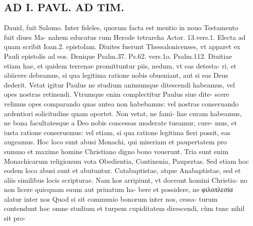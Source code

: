\documentclass{article}
\begin{document}
\begin{pages}
\section*{AD I. PAVL. AD TIM. }
\marginpar{[ p.440 ]}\pstart Dauid, fuit Salomo. Inter fideles, quorum facta est mentio in nouo Testamento fuit diues Ma- nahem educatus cum Herode tetrarcha Actor. 13.vers.1. Electa ad quam scribit Ioan.2. epistolam. Diuites fuerunt Thessalonicenses, vt apparet ex Pauli epistolis ad eos. Denique Psalm.37. Ps.62. vers.1o. Psalm.112. Diuitiae etiam hae, et quidem terrenae promittuntur piis, nedum, vt eas detesta- ri, et abiicere debeamus, si qua legitima ratione nobis obueniant, aut si eas Deus dederit.  \pend\pstart Vetat igitur Paulus ne studium animumque ditescendi habeamus, vel opes nostras retinendi. Vtrumque enim complectitur Paulus siue dite- scere velimus opes comparando quas antea non habebamus: vel nostras conseruando ardentiori solicitudine quam oportet. Non vetat, ne fami- liae curam habeamus, ne bona facultatesque a Deo nobis concessas moderate tueamur, cure- mus, et iusta ratione conseruemus: vel etiam, si qua ratione legitima fieri possit, eas augeamus. Hoc loco sunt abusi Monachi, qui miseriam et paupertatem pro summo et maxime homine Christiano digno bono vouerunt. Tria sunt enim Monachicarum religionum vota Obedientia, Continenia, Paupertas. Sed etiam hoc eodem loco abusi sunt et abutuntur. Catabaptistae, atque  Anabaptistae, sed et aliis similibus locis scripturae. Nam hos arripiunt, vt doceant homini Christia- no non licere quicquam suum aut priuatum ha- bere et possidere, ne φιλοπλεσία alatur inter nos Quod si sit communio bonorum inter nos, cessa- turum contendunt hoc omne studium et turpem cupiditatem direscendi, cùm tunc nihil sit pro-  \pend

\end{pages}
\end{document}
